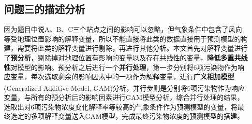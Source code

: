\documentclass[a4paper,10pt]{my_paper}
\numberwithin{equation}{section}
\begin{document}




\subsection{问题三的描述分析}
因为题目中说A、B、C三个站点之间的影响可以忽略，但气象条件中包含了风向等受地理位置影响的解释变量，所以不能直接将此类的数据直接用于预测模型的构建，需要将此类的解释变量进行剔除，再进行其他分析。本文首先对解释变量进行了\textbf{预分析}，剔除掉对地理位置有影响的变量以及存在共线性的变量，\textbf{降低多重共线性}对模型的影响。预分析之后进行一个\textbf{并行处理}，第一步分别将6项污染物作为响应变量，每次选取剩余的影响因素中的一项作为解释变量，进行\textbf{广义相加模型}(Generalized Additive Model, GAM)分析\textsuperscript{\cite{ref5}}，并行步则是分别将6项污染物作为响应变量，与所有的预分析后的影响因素进行GAM模型分析，综合并行处理的结果，选取出对6项污染物浓度变化解释率等较高的气象条件作为预测模型的变量，将最终选定的多项解释变量送入GAM模型，完成最终污染物浓度的预测模型的搭建。

\end{document}
